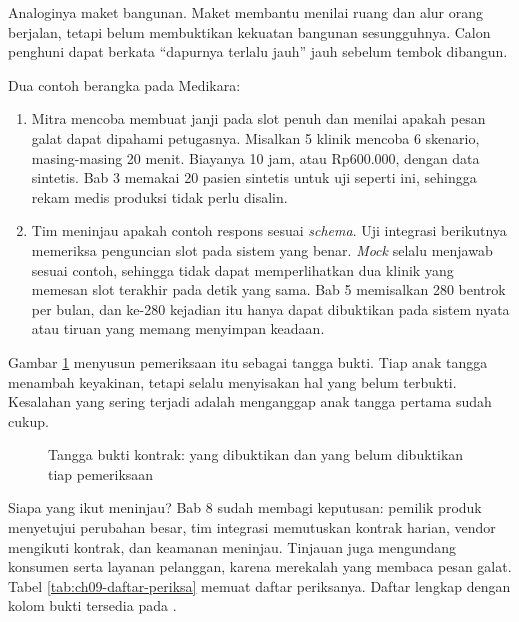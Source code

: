 Analoginya maket bangunan. Maket membantu menilai ruang dan alur orang berjalan, tetapi belum membuktikan kekuatan bangunan sesungguhnya. Calon penghuni dapat berkata ``dapurnya terlalu jauh'' jauh sebelum tembok dibangun.

Dua contoh berangka pada Medikara:
\begin{enumerate}
  \item Mitra mencoba membuat janji pada slot penuh dan menilai apakah pesan galat dapat dipahami petugasnya. Misalkan 5 klinik mencoba 6 skenario, masing-masing 20 menit. Biayanya 10 jam, atau Rp600.000, dengan data sintetis. Bab 3 memakai 20 pasien sintetis
        untuk uji seperti ini, sehingga rekam medis produksi tidak perlu disalin.
  \item Tim meninjau apakah contoh respons sesuai \textit{schema}. Uji integrasi berikutnya memeriksa penguncian slot pada sistem yang benar. \textit{Mock} selalu menjawab sesuai contoh, sehingga tidak dapat memperlihatkan dua klinik yang memesan slot terakhir pada detik yang sama. Bab 5 memisalkan 280 bentrok
        per bulan, dan ke-280 kejadian itu hanya dapat dibuktikan pada sistem nyata atau tiruan yang memang menyimpan keadaan.
\end{enumerate}

Gambar \ref{fig:ch09-tangga} menyusun pemeriksaan itu sebagai tangga bukti. Tiap anak tangga menambah keyakinan, tetapi selalu menyisakan hal yang belum terbukti. Kesalahan yang sering terjadi adalah menganggap anak tangga pertama sudah cukup.

\begin{figure}[!htb]
  \centering
  
  \caption{Tangga bukti kontrak: yang dibuktikan dan yang belum dibuktikan tiap pemeriksaan}
  \label{fig:ch09-tangga}
\end{figure}

Siapa yang ikut meninjau? Bab 8 sudah membagi keputusan: pemilik produk menyetujui perubahan besar, tim integrasi memutuskan kontrak harian, vendor mengikuti kontrak, dan keamanan meninjau. Tinjauan juga mengundang konsumen serta layanan pelanggan, karena merekalah yang membaca pesan galat. Tabel
\ref{tab:ch09-daftar-periksa} memuat daftar periksanya. Daftar lengkap dengan kolom bukti tersedia pada .

